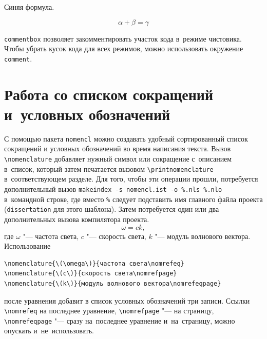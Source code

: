 \begin{commentbox}[blue]
    Синяя формула.

    \begin{equation}
        \alpha + \beta = \gamma
    \end{equation}
\end{commentbox}

\verb+commentbox+ позволяет закомментировать участок кода в~режиме чистовика.
Чтобы убрать кусок кода для всех режимов, можно использовать окружение
\verb+comment+.

\section{Работа со списком сокращений и~условных обозначений}\label{sec:acronyms}

С помощью пакета \texttt{nomencl} можно создавать удобный сортированный список
сокращений и условных обозначений во время написания текста. Вызов
\verb+\nomenclature+ добавляет нужный символ или сокращение с~описанием
в~список, который затем печатается вызовом \verb+\printnomenclature+
в~соответствующем разделе.
Для того, чтобы эти операции прошли, потребуется дополнительный вызов
\verb+makeindex -s nomencl.ist -o %.nls %.nlo+ в~командной строке, где вместо
\verb+%+ следует подставить имя главного файла проекта (\verb+dissertation+
для этого шаблона).
Затем потребуется один или два дополнительных вызова компилятора проекта.
\begin{equation}
    \omega = c k,
\end{equation}
где \( \omega \) "--- частота света, \( c \) "--- скорость света, \( k \) "---
модуль волнового вектора.
Использование
\begin{verbatim}
\nomenclature{\(\omega\)}{частота света\nomrefeq}
\nomenclature{\(c\)}{скорость света\nomrefpage}
\nomenclature{\(k\)}{модуль волнового вектора\nomrefeqpage}
\end{verbatim}
после уравнения добавит в список условных обозначений три записи.
Ссылки \verb+\nomrefeq+ на последнее уравнение, \verb+\nomrefpage+ "--- на
страницу, \verb+\nomrefeqpage+ "--- сразу на~последнее уравнение и~на~страницу,
можно опускать и~не~использовать.

